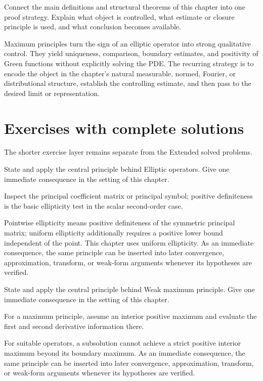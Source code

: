 \begin{problem}\label{prob:iii27-problem-12}
Connect the main definitions and structural theorems of this chapter into one proof strategy. Explain what object is controlled, what estimate or closure principle is used, and what conclusion becomes available.
\end{problem}
\begin{solution}
Maximum principles turn the sign of an elliptic operator into strong qualitative control. They yield uniqueness, comparison, boundary estimates, and positivity of Green functions without explicitly solving the PDE. The recurring strategy is to encode the object in the chapter's natural measurable, normed, Fourier, or distributional structure, establish the controlling estimate, and then pass to the desired limit or representation.
\end{solution}
\section{Exercises with complete solutions}
The shorter exercise layer remains separate from the Extended solved problems.

\begin{exercise}\label{exr:iii27-01}
State and apply the central principle behind Elliptic operators. Give one immediate consequence in the setting of this chapter.
\end{exercise}
\begin{hint}
Inspect the principal coefficient matrix or principal symbol; positive definiteness is the basic ellipticity test in the scalar second-order case.
\end{hint}
\begin{solution}
Pointwise ellipticity means positive definiteness of the symmetric principal matrix; uniform ellipticity additionally requires a positive lower bound independent of the point. This chapter uses uniform ellipticity. As an immediate consequence, the same principle can be inserted into later convergence, approximation, transform, or weak-form arguments whenever its hypotheses are verified.
\end{solution}

\begin{exercise}\label{exr:iii27-02}
State and apply the central principle behind Weak maximum principle. Give one immediate consequence in the setting of this chapter.
\end{exercise}
\begin{hint}
For a maximum principle, assume an interior positive maximum and evaluate the first and second derivative information there.
\end{hint}
\begin{solution}
For suitable operators, a subsolution cannot achieve a strict positive interior maximum beyond its boundary maximum. As an immediate consequence, the same principle can be inserted into later convergence, approximation, transform, or weak-form arguments whenever its hypotheses are verified.
\end{solution}


